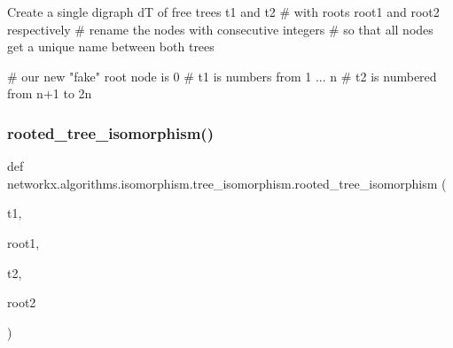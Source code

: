 \begin{DoxyVerb}Create a single digraph dT of free trees t1 and t2
#   with roots root1 and root2 respectively
# rename the nodes with consecutive integers
# so that all nodes get a unique name between both trees

# our new "fake" root node is 0
# t1 is numbers from 1 ... n
# t2 is numbered from n+1 to 2n
\end{DoxyVerb}
 \mbox{\label{namespacenetworkx_1_1algorithms_1_1isomorphism_1_1tree__isomorphism_a77311446523f91a7c1fa30d21ce78e05}} 
\subsubsection{\texorpdfstring{rooted\+\_\+tree\+\_\+isomorphism()}{rooted\_tree\_isomorphism()}}
{\footnotesize\ttfamily def networkx.\+algorithms.\+isomorphism.\+tree\+\_\+isomorphism.\+rooted\+\_\+tree\+\_\+isomorphism (\begin{DoxyParamCaption}\item[{}]{t1,  }\item[{}]{root1,  }\item[{}]{t2,  }\item[{}]{root2 }\end{DoxyParamCaption})}

